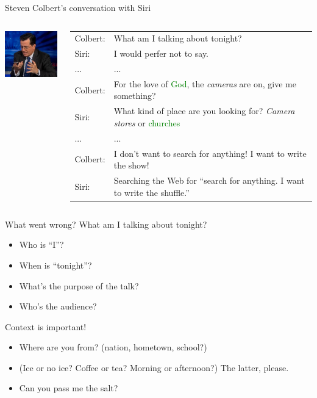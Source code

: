 \documentclass[usenames,dvipsnames,notes]{beamer}
\begin{document}
\begin{frame}
    {Steven Colbert's conversation with Siri}
    \begin{columns}
        \begin{column}{0.3\textwidth}
            \includegraphics[width=3cm]{figures/colbert-siri}
        \end{column}
        \begin{column}{0.7\textwidth}
            \begin{tabular}{lp{6cm}}
                Colbert: & What am I talking about tonight? \\
                Siri: & I would perfer not to say. \\
                ... & ...\\
                Colbert: & For the love of \textcolor{Green}{God}, the \emph{cameras} are on, give me something?\\
                Siri: & What kind of place are you looking for? \emph{Camera stores} or \textcolor{Green}{churches} \\
                ... & ...\\
                Colbert: & I don't want to search for anything! I want to write the show!\\
                Siri: & Searching the Web for ``search for anything. I want to write the shuffle.''
            \end{tabular}
        \end{column}
    \end{columns}
\end{frame}

\begin{frame}
    {What went wrong?}
    What am I talking about tonight?\\
    \begin{itemize}
        \item Who is ``I''?
        \item When is ``tonight''?
        \item What's the purpose of the talk?
        \item Who's the audience?
    \end{itemize}

    Context is important!\\
    \begin{itemize}
        \item Where are you from? (nation, hometown, school?) 
        \item (Ice or no ice? Coffee or tea? Morning or afternoon?) The latter, please.
        \item Can you pass me the salt?
    \end{itemize}
\end{frame}
\end{document}
